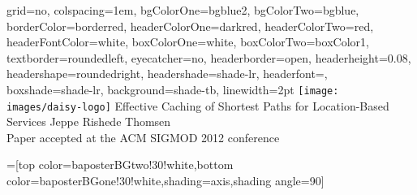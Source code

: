 \documentclass[a3shrink,landscape, final]{baposter}
\begin{document}
\newlength{\leftimgwidth}
\begin{poster} { %
  grid=no,
  colspacing=1em,
  bgColorOne=bgblue2,
  bgColorTwo=bgblue,
  borderColor=borderred,
  headerColorOne=darkred,
  headerColorTwo=red,
  headerFontColor=white,
  boxColorOne=white,
  boxColorTwo=boxColor1,
  textborder=roundedleft,
  eyecatcher=no,
  headerborder=open,
  headerheight=0.08\textheight,
  headershape=roundedright,
  headershade=shade-lr,
  headerfont=\Large\textsf, %
  boxshade=shade-lr,
  background=shade-tb,
  linewidth=2pt
  }
  {\texttt{[image: images/daisy-logo]}} %
  {\sf %
  Effective Caching of Shortest Paths for Location-Based Services}
  {\sf %
  Jeppe Rishede Thomsen\\
  {\large Paper accepted at the ACM SIGMOD 2012 conference}
  }
  {%
  }

  =[top color=baposterBGtwo!30!white,bottom color=baposterBGone!30!white,shading=axis,shading angle=90]

     \setlength{\leftimgwidth}{0.78em+8.0em}


\end{poster}
\end{document}
